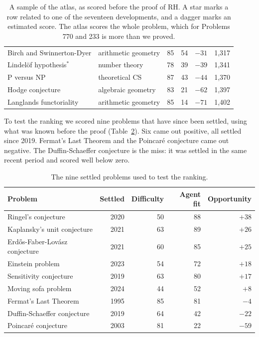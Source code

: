 \documentclass[11pt]{amsart}
\begin{document}
\begin{table}[ht]
\begin{tabular}{@{}llrrrr@{}}
Birch and Swinnerton-Dyer & arithmetic geometry & 85 & 54 & $-31$ & 1{,}317\\
Lindel\"of hypothesis$^{*}$ & number theory & 78 & 39 & $-39$ & 1{,}341\\
P versus NP & theoretical CS & 87 & 43 & $-44$ & 1{,}370\\
Hodge conjecture & algebraic geometry & 83 & 21 & $-62$ & 1{,}397\\
Langlands functoriality & arithmetic geometry & 85 & 14 & $-71$ & 1{,}402\\
\bottomrule
\end{tabular}
\medskip
\caption{A sample of the atlas, as scored before the proof of RH. A star marks a row related to one of the seventeen developments, and a dagger marks an estimated score. The atlas scores the whole problem, which for Problems 770 and 233 is more than we proved.}\label{tab:atlas}
\end{table}

To test the ranking we scored nine problems that have since been settled, using what was known before the proof (Table~\ref{tab:calib}). Six came out positive, all settled since 2019. Fermat's Last Theorem and the Poincar\'e conjecture came out negative. The Duffin-Schaeffer conjecture is the miss: it was settled in the same recent period and scored well below zero.

\begin{table}[ht]
\small
\begin{tabular}{@{}lrrrr@{}}
\toprule
Problem & Settled & Difficulty & Agent fit & Opportunity\\
\midrule
Ringel's conjecture & 2020 & 50 & 88 & $+38$\\
Kaplansky's unit conjecture & 2021 & 63 & 89 & $+26$\\
Erd\H{o}s-Faber-Lov\'asz conjecture & 2021 & 60 & 85 & $+25$\\
Einstein problem & 2023 & 54 & 72 & $+18$\\
Sensitivity conjecture & 2019 & 63 & 80 & $+17$\\
Moving sofa problem & 2024 & 44 & 52 & $+8$\\
Fermat's Last Theorem & 1995 & 85 & 81 & $-4$\\
Duffin-Schaeffer conjecture & 2019 & 64 & 42 & $-22$\\
Poincar\'e conjecture & 2003 & 81 & 22 & $-59$\\
\bottomrule
\end{tabular}
\medskip
\caption{The nine settled problems used to test the ranking.}\label{tab:calib}
\end{table}
\end{document}
